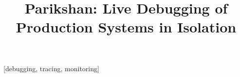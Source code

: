 \documentclass{sig-alternate}
\begin{document}

\title{\Large \bf Parikshan\xspace: Live Debugging of Production Systems in Isolation}


\maketitle


\newcommand{\iprobe}{\texttt{iProbe}\xspace}
\newcommand{\parikshan}{\texttt{Parikshan}\xspace}
\newcommand{\livedebugging}{\textit{live debugging}\xspace}
\newcommand{\debugcontainer}{\textit{debug container}\xspace}
\newtheorem{example}{Example}
\def\infinity{\rotatebox{90}{8}}



\vspace{-2pt}
[debugging, tracing, monitoring]

\vspace{-4pt}


%
%


%
%





%


\pagebreak
%
%






\end{document}
